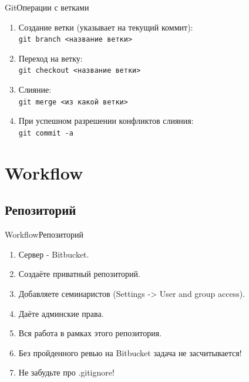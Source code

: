 \documentclass[10pt]{beamer}
\begin{document}
\begin{frame}[fragile]{Git}{Операции с ветками}
\begin{enumerate}
\item Создание ветки (указывает на текущий коммит):\\
\texttt{git branch <название ветки>}\\
\item Переход на ветку:\\
\texttt{git checkout <название ветки>}\\
\item Слияние:\\
\texttt{git merge <из какой ветки>}\\
\item При успешном разрешении конфликтов слияния:\\
\texttt{git commit -a}\\
\end{enumerate}
\end{frame}

\section{Workflow}
\subsection{Репозиторий}
\begin{frame}[fragile]{Workflow}{Репозиторий}
\begin{enumerate}
\item Сервер - Bitbucket.
\item Создаёте приватный репозиторий.
\item Добавляете семинаристов (Settings -> User and group access).
\item Даёте админские права.
\item Вся работа в рамках этого репозитория.
\item Без пройденного ревью на Bitbucket задача не засчитывается!
\item Не забудьте про .gitignore!
\end{enumerate}
\end{frame}
\end{document}
